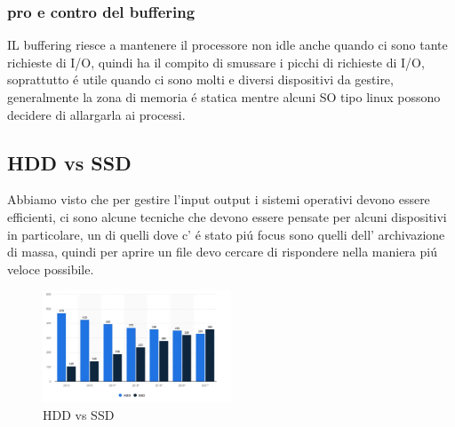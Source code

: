 \subsubsection*{pro e contro del buffering}
IL buffering riesce a mantenere il processore non idle anche quando ci sono tante richieste di I/O, quindi ha il compito
di smussare i picchi di richieste di I/O, soprattutto é utile quando ci sono molti e diversi dispositivi da gestire, generalmente
la zona di memoria é statica mentre alcuni SO tipo linux possono decidere di allargarla ai processi.
\subsection{HDD vs SSD}
Abbiamo visto che per gestire l'input output i sistemi operativi devono essere efficienti, ci sono alcune tecniche che devono essere
pensate per alcuni dispositivi in particolare, un di quelli dove c' é stato piú focus sono quelli dell' archivazione di massa,
quindi per aprire un file devo cercare di rispondere nella maniera piú veloce possibile.
\begin{figure}[H]
    \centering
    \includegraphics[width=0.5\textwidth]{immagini/HDDvsSDD}
    \caption{HDD vs SSD}
\end{figure}
